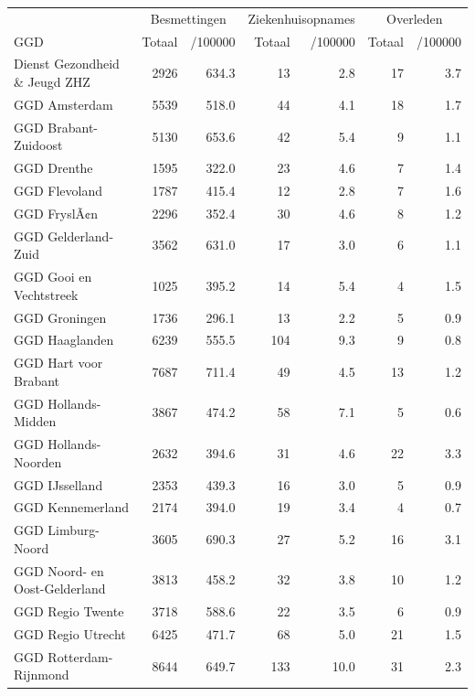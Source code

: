 \documentclass[
  english,
  man,floatsintext]{apa6}
\begin{document}
\begin{table}
\centering\begingroup\fontsize{10}{12}\selectfont

\begin{threeparttable}
\begin{tabular}{lrrrrrr}
\toprule
\multicolumn{1}{c}{ } & \multicolumn{2}{c}{Besmettingen} & \multicolumn{2}{c}{Ziekenhuisopnames} & \multicolumn{2}{c}{Overleden} \\
\cmidrule(l{3pt}r{3pt}){2-3} \cmidrule(l{3pt}r{3pt}){4-5} \cmidrule(l{3pt}r{3pt}){6-7}
GGD & Totaal & /100000 & Totaal & /100000 & Totaal & /100000\\
\midrule
Dienst Gezondheid \& Jeugd ZHZ & 2926 & 634.3 & 13 & 2.8 & 17 & 3.7\\
GGD Amsterdam & 5539 & 518.0 & 44 & 4.1 & 18 & 1.7\\
GGD Brabant-Zuidoost & 5130 & 653.6 & 42 & 5.4 & 9 & 1.1\\
GGD Drenthe & 1595 & 322.0 & 23 & 4.6 & 7 & 1.4\\
GGD Flevoland & 1787 & 415.4 & 12 & 2.8 & 7 & 1.6\\
GGD FryslÃ¢n & 2296 & 352.4 & 30 & 4.6 & 8 & 1.2\\
GGD Gelderland-Zuid & 3562 & 631.0 & 17 & 3.0 & 6 & 1.1\\
GGD Gooi en Vechtstreek & 1025 & 395.2 & 14 & 5.4 & 4 & 1.5\\
GGD Groningen & 1736 & 296.1 & 13 & 2.2 & 5 & 0.9\\
GGD Haaglanden & 6239 & 555.5 & 104 & 9.3 & 9 & 0.8\\
GGD Hart voor Brabant & 7687 & 711.4 & 49 & 4.5 & 13 & 1.2\\
GGD Hollands-Midden & 3867 & 474.2 & 58 & 7.1 & 5 & 0.6\\
GGD Hollands-Noorden & 2632 & 394.6 & 31 & 4.6 & 22 & 3.3\\
GGD IJsselland & 2353 & 439.3 & 16 & 3.0 & 5 & 0.9\\
GGD Kennemerland & 2174 & 394.0 & 19 & 3.4 & 4 & 0.7\\
GGD Limburg-Noord & 3605 & 690.3 & 27 & 5.2 & 16 & 3.1\\
GGD Noord- en Oost-Gelderland & 3813 & 458.2 & 32 & 3.8 & 10 & 1.2\\
GGD Regio Twente & 3718 & 588.6 & 22 & 3.5 & 6 & 0.9\\
GGD Regio Utrecht & 6425 & 471.7 & 68 & 5.0 & 21 & 1.5\\
GGD Rotterdam-Rijnmond & 8644 & 649.7 & 133 & 10.0 & 31 & 2.3\\

\end{tabular}
\end{threeparttable}
\end{table}
\end{document}
